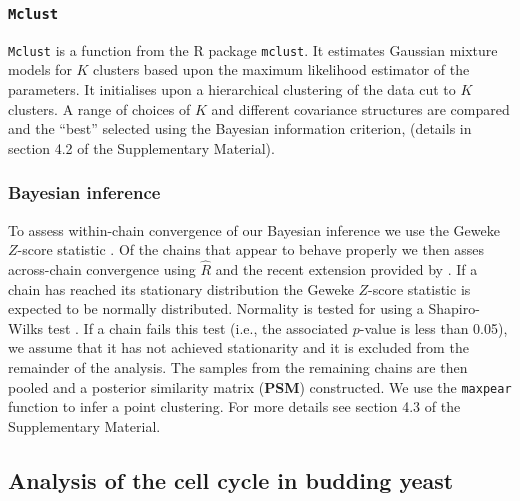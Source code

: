 \documentclass{bmcart}
\begin{document}
	\subsubsection*{\texttt{Mclust}}
	\texttt{Mclust} \citep{mclust2016scrucca} is a function from the R package \texttt{mclust}. It estimates Gaussian mixture models for $K$ clusters based upon the maximum likelihood estimator of the parameters. It initialises upon a hierarchical clustering of the data cut to $K$ clusters. A range of choices of $K$ and different covariance structures are compared and the ``best'' selected using the Bayesian information criterion, \citep[][]{schwarz1978estimating} (details in section 4.2 of the Supplementary Material).
	
	\subsubsection*{Bayesian inference}
		
	To assess within-chain convergence of our Bayesian inference we use the Geweke $Z$-score statistic \citep{geweke1991evaluating}. Of the chains that appear to behave properly we then asses across-chain convergence using $\hat{R}$ \citep{gelman1992inference} and the recent extension provided by \cite{vats2018revisiting}. If a chain has reached its stationary distribution the Geweke $Z$-score statistic is expected to be normally distributed. Normality is tested for using a Shapiro-Wilks test \citep{shapiro1965analysis}. If a chain fails this test (i.e., the associated $p$-value is less than 0.05), we assume that it has not achieved stationarity and it is excluded from the remainder of the analysis. The samples from the remaining chains are then pooled and a posterior similarity matrix (\textbf{PSM}) constructed. We use the \texttt{maxpear} function to infer a point clustering. For more details see section 4.3 of the Supplementary Material.
	
	\subsection*{Analysis of the cell cycle in budding yeast}
\end{document}
